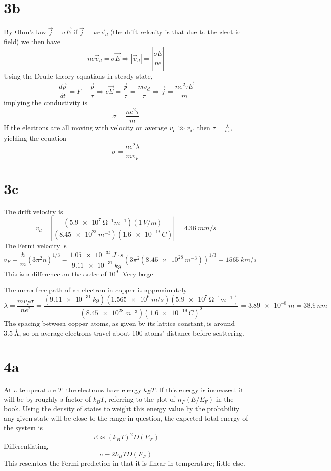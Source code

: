 \documentclass{article}
\begin{document}
\section*{3b}
By Ohm's law $\vec{j}=\sigma\vec{E}$ if $\vec{j}=ne\vec{v}_{d}$ (the drift velocity is that due to the electric field) we then have
\[ne\vec{v}_{d}=\sigma\vec{E}\Rightarrow |\vec{v}_{d}|=\left| \frac{\sigma \vec{E}}{ne}\right|\]
Using the Drude theory equations in steady-state,
\[\frac{d\vec{p}}{dt}=F-\frac{\vec{p}}{\tau}\Rightarrow e\vec{E}=\frac{\vec{p}}{\tau}=\frac{mv_{d}}{\tau}\Rightarrow \vec{j}=\frac{ne^{2}\tau\vec{E}}{m}\]
implying the conductivity is
\[\sigma=\frac{ne^{2}\tau}{m}\]
If the electrons are all moving with velocity on average $v_{F} \gg v_{d}$, then $\tau = \frac{\lambda}{v_{F}}$, yielding the equation
\[\sigma = \frac{ne^{2}\lambda}{mv_{F}}\]

\section*{3c}
The drift velocity is
\[v_{d}=\left| \frac{(\SI{5.9e7}{\ohm^{-1}m^{-1}})(\SI{1}{V/m})}{(\SI{8.45e28}{m^{-3}})(\SI{1.6e-19}{C})} \right|=\SI{4.36}{mm/s}\]
The Fermi velocity is
\[v_{F}=\frac{\hbar}{m}(3\pi^{2}n)^{1/3}=\frac{\SI{1.05e-34}{J\cdot s}}{\SI{9.11e-31}{kg}}(3\pi^{2}(\SI{8.45e28}{m^{-3}}))^{1/3}=\SI{1565}{km/s}\]
This is a difference on the order of $10^{9}$. Very large.

The mean free path of an electron in copper is approximately
\[\lambda=\frac{mv_{F}\sigma}{ne^{2}}=\frac{(\SI{9.11e-31}{kg})(\SI{1.565e6}{m/s})(\SI{5.9e7}{\ohm^{-1}m^{-1}})}{(\SI{8.45e28}{m^{-3}})(\SI{1.6e-19}{C})^{2}}=\SI{3.89e-8}{m}=\SI{38.9}{nm}\]
The spacing between copper atoms, as given by its lattice constant, is around $\SI{3.5}{\angstrom}$, so on average electrons travel about 100 atoms' distance before scattering.

\section*{4a}
At a temperature $T$, the electrons have energy $k_{B}T$. If this energy is increased, it will be by roughly a factor of $k_{B}T$, referring to the plot of $n_{F}(E/E_{F})$ in the book. Using the density of states to weight this energy value by the probability any given state will be close to the range in question, the expected total energy of the system is
\[E\approx(k_{B}T)^{2}D(E_{F})\]
Differentiating,
\[c=2k_{B}TD(E_{F})\]
This resembles the Fermi prediction in that it is linear in temperature; little else.
\end{document}
